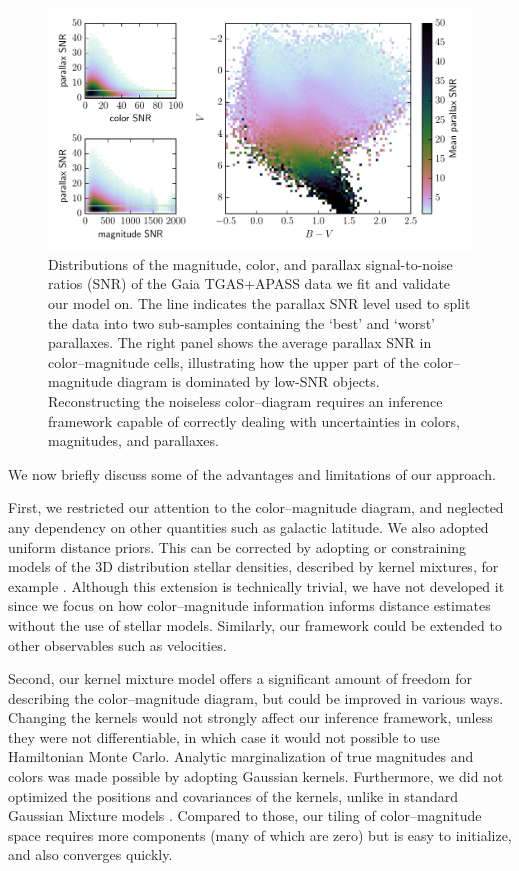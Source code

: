 \documentclass[manuscript, letterpaper]{aastex6}
\newcommand{\eg}{{\textit{e.g.},~}}
\begin{document}
\begin{figure}
\hspace*{-3mm}\includegraphics[width=15.75cm]{datasummary.pdf}
\caption{Distributions of the magnitude, color, and parallax signal-to-noise ratios (SNR) of the Gaia TGAS+APASS data we fit and validate our model on. The line indicates the parallax SNR level used to split the data into two sub-samples containing the `best' and `worst' parallaxes. The right panel shows the average parallax SNR in color--magnitude cells, illustrating how the upper part of the color--magnitude diagram is dominated by low-SNR objects. Reconstructing the noiseless color--diagram requires an inference framework capable of correctly dealing with uncertainties in colors, magnitudes, and parallaxes.}
\label{fig:datasummary}
\end{figure}

We now briefly discuss some of the advantages and limitations of our approach.

First, we restricted our attention to the color--magnitude diagram, and neglected any dependency on other quantities such as galactic latitude.
We also adopted uniform distance priors.
This can be corrected by adopting or constraining models of the 3D distribution stellar densities, described by kernel mixtures, for example \citep[see \eg][]{Astraatmadja22016, Astraatmadja2016}.  
Although this extension is technically trivial, we have not developed it since we focus on how color--magnitude information informs distance estimates without the use of stellar models.
Similarly, our framework could be extended to other observables such as velocities.

Second, our kernel mixture model offers a significant amount of freedom for describing the color--magnitude diagram, but could be improved in various ways.
Changing the kernels would not strongly affect our inference framework, unless they were not differentiable, in which case it would not possible to use Hamiltonian Monte Carlo.
Analytic marginalization of true magnitudes and colors was made possible by adopting Gaussian kernels. 
Furthermore, we did not optimized the positions and covariances of the kernels, unlike in standard Gaussian Mixture models \citep[\eg][]{bovy2011}. 
Compared to those, our tiling of color--magnitude space requires more components (many of which are zero) but is easy to initialize, and also converges quickly. 
\end{document}
